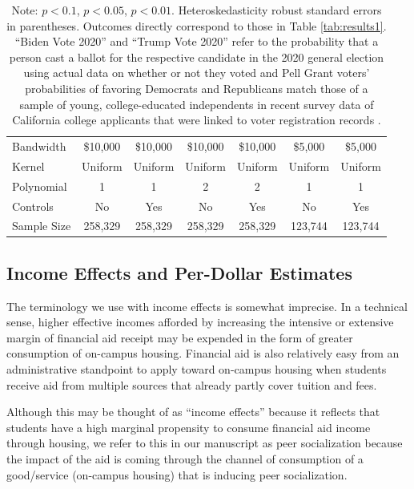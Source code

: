 \documentclass[12pt,letterpaper,oneside]{book}
\begin{document}
\begin{table}[h!]
\begin{tabular}{l*{6}{c}}
        \hline
        Bandwidth & \$10,000       &   \$10,000        &   \$10,000        &   \$10,000       &   \$5,000        &   \$5,000        \\
        Kernel&   Uniform      &   Uniform        &   Uniform        &   Uniform       &   Uniform       &   Uniform       \\
        Polynomial&   1       &   1        &   2        &   2       &   1       &   1       \\
        Controls&   No       &   Yes        &   No        &   Yes        &   No        &   Yes        \\
        Sample Size      &   258,329     &    258,329      &      258,329      &   258,329    &   123,744       &   123,744        \\
        \hline
    \end{tabular}
    \caption*{\footnotesize Note: \sym{+} \(p<0.1\), \sym{*} \(p<0.05\), \sym{**} \(p<0.01\). Heteroskedasticity robust standard errors in parentheses. Outcomes directly correspond to those in Table \ref{tab:results1}. ``Biden Vote 2020'' and ``Trump Vote 2020'' refer to the probability that a person cast a ballot for the respective candidate in the 2020 general election using actual data on whether or not they voted and Pell Grant voters' probabilities of favoring Democrats and Republicans match those of a sample of young, college-educated independents in recent survey data of California college applicants that were linked to voter registration records \citep{firoozi_effect_2023}.}
\end{table}

\clearpage


\subsection{Income Effects and Per-Dollar Estimates}\label{sec:income}

The terminology we use with income effects is somewhat imprecise. In a technical sense, higher effective incomes afforded by increasing the intensive or extensive margin of financial aid receipt may be expended in the form of greater consumption of on-campus housing. Financial aid is also relatively easy from an administrative standpoint to apply toward on-campus housing when students receive aid from multiple sources that already partly cover tuition and fees.

Although this may be thought of as “income effects” because it reflects that students have a high marginal propensity to consume financial aid income through housing, we refer to this in our manuscript as peer socialization because the impact of the aid is coming through the channel of consumption of a good/service (on-campus housing) that is inducing peer socialization.
\end{document}
